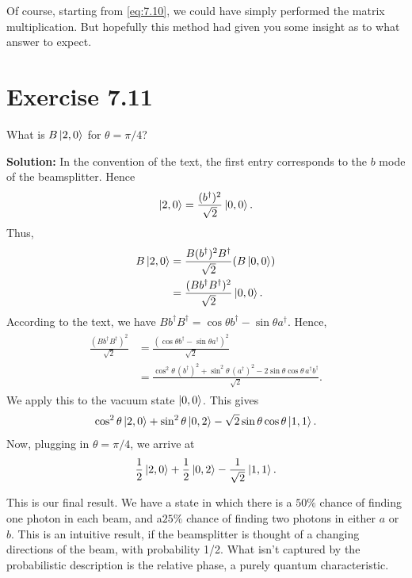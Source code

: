 \documentclass{book}
\begin{document}
    Of course, starting from \eqref{eq:7.10}, we could have simply performed the matrix multiplication. But hopefully this method had given you some insight as to what answer to expect. 

\section*{Exercise 7.11}
    What is $B\ket{2,0}$ for $\theta = \pi/4$?

    \textbf{Solution:} In the convention of the text, the first entry corresponds to the $b$ mode of the beamsplitter. Hence
    \begin{align}
        \ket{2,0} = \frac{(b^\dagger)^2}{\sqrt{2}} \ket{0,0}.
    \end{align}
    Thus,
    \begin{align}
    \begin{aligned}
        B\ket{2,0} &= \frac{B (b^\dagger)^2 B^
        \dagger}{\sqrt{2}} (B \ket{0,0}) \\
        &= \frac{(B b^\dagger B^\dagger)^2}{\sqrt{2}} \ket{0,0}.
    \end{aligned}
    \end{align}
    According to the text, we have $B b^\dagger B^\dagger = \cos \theta b^\dagger - \sin\theta a^\dagger$. Hence,
    \begin{align}
    \begin{aligned}
        \frac{(Bb^\dagger B^\dagger)^2}{\sqrt{2}} &= \frac{(\cos \theta b^\dagger - \sin\theta a^\dagger)^2}{\sqrt{2}} \\
        &= \frac{\cos^2 \theta\, (b^\dagger)^2 + \sin^2 \theta\,(a^\dagger)^2 - 2 \sin\theta \cos\theta\, a^\dagger b^\dagger}{\sqrt{2}}.
    \end{aligned}
    \end{align}
    We apply this to the vacuum state $\ket{0,0}$. This gives
    \begin{align}
        \cos^2 \theta \ket{2,0} + \sin^2 \theta \ket{0,2} - \sqrt{2} \sin\theta \cos\theta \ket{1,1}.
    \end{align}
    Now, plugging in $\theta = \pi/4$, we arrive at 
    \begin{align}
        \frac{1}{2}\ket{2,0} + \frac{1}{2} \ket{0,2} - \frac{1}{\sqrt{2}} \ket{1,1}.
    \end{align}
    
    This is our final result. We have a state in which there is a $50\%$ chance of finding one photon in each beam, and a$25\%$ chance of finding two photons in either $a$ or $b$. This is an intuitive result, if the beamsplitter is thought of a changing directions of the beam, with probability 1/2. What isn't captured by the probabilistic description is the relative phase, a purely quantum characteristic.
\end{document}

